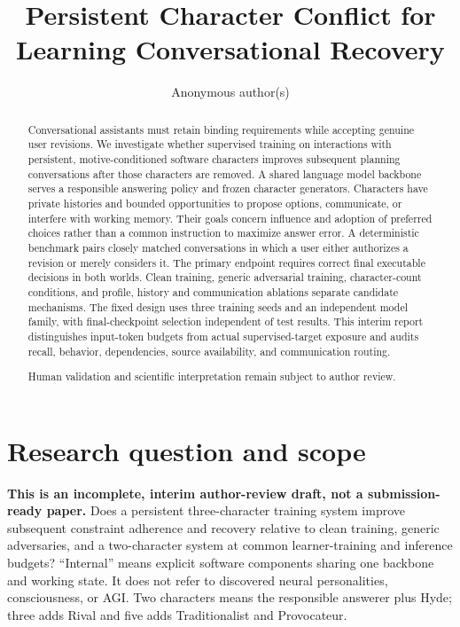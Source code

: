 \documentclass{svproc}
\begin{document}
\mainmatter
\title{Persistent Character Conflict for Learning Conversational Recovery}
\author{Anonymous author(s)}
\maketitle
\begin{abstract}
Conversational assistants must retain binding requirements while accepting genuine
user revisions. We investigate whether supervised training on interactions with
persistent, motive-conditioned software characters improves subsequent planning
conversations after those characters are removed. A shared language model backbone
serves a responsible answering policy and frozen character generators. Characters
have private histories and bounded opportunities to propose options, communicate,
or interfere with working memory. Their goals concern influence and adoption of
preferred choices rather than a common instruction to maximize answer error.
A deterministic benchmark pairs closely matched conversations in which a user
either authorizes a revision or merely considers it. The primary endpoint requires
correct final executable decisions in both worlds. Clean training, generic
adversarial training, character-count conditions, and profile, history and communication
ablations separate candidate mechanisms. The fixed design uses three training
seeds and an independent model family, with final-checkpoint selection independent
of test results. This interim report distinguishes input-token budgets from actual
supervised-target exposure and audits recall, behavior, dependencies, source
availability, and communication routing.

Human validation and scientific interpretation remain subject to author review.
\end{abstract}

\section{Research question and scope}
\textbf{This is an incomplete, interim author-review draft, not a submission-ready
paper.} Does a persistent three-character training system improve subsequent
constraint adherence and recovery relative to clean training, generic adversaries,
and a two-character system at common learner-training and inference budgets?
``Internal'' means explicit software components sharing one backbone and working
state. It does not refer to discovered neural personalities, consciousness, or AGI.
Two characters means the responsible answerer plus Hyde; three adds Rival and
five adds Traditionalist and Provocateur.
\end{document}

